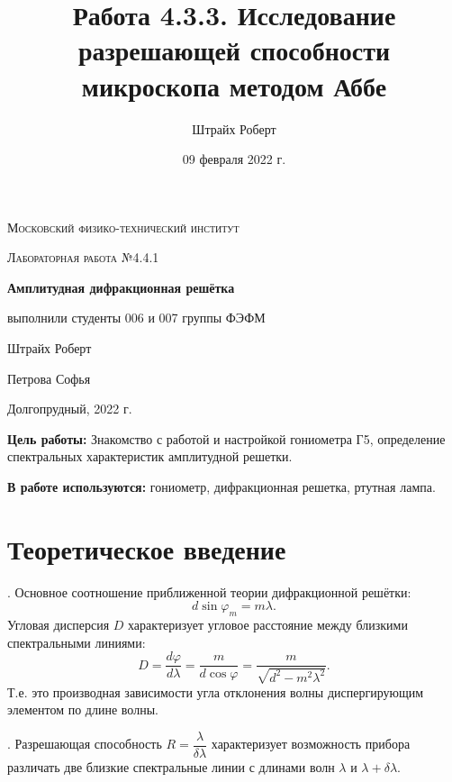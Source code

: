 \documentclass[a4paper, 12pt]{article}
\author{Штрайх Роберт}
\title{Работа 4.3.3. Исследование разрешающей способности микроскопа методом Аббе}
\date{09 февраля 2022 г.}
\begin{document}
\begin{titlepage}
	\centering
	\vspace{5cm}
	{\scshape\LARGE Московский физико-технический институт \par}
	\vspace{4cm}
	{\scshape\Large Лабораторная работа №4.4.1 \par}
	\vspace{1cm}
	{\huge\bfseries Амплитудная дифракционная решётка\par}
	\vspace{1cm}
	\vfill
\begin{flushright}
	{\Large выполнили студенты 006 и 007 группы ФЭФМ}\par
	\vspace{0.3cm}
	{\Large Штрайх Роберт}\par
	\vspace{0.3cm}
	{\Large Петрова Софья}
\end{flushright}
	

	\vfill

	Долгопрудный, 2022 г.
\end{titlepage}

\newpage

\textbf{Цель работы:} Знакомство с работой и настройкой гониометра Г5, определение спектральных характеристик амплитудной решетки.

\textbf{В работе используются:} гониометр, дифракционная решетка, ртутная лампа.

\section*{Теоретическое введение}

. Основное соотношение приближенной теории дифракционной решётки:
	\begin{equation}
	d\sin \varphi_m = m\lambda.
	\end{equation}
	Угловая дисперсия $D$ характеризует угловое расстояние между близкими спектральными линиями:
	\begin{equation}
	D = \frac{d\varphi}{d\lambda} = \frac{m}{d \cos \varphi}=\frac{m}{\sqrt{d^{2}-m^{2} \lambda^{2}}}.
	\end{equation}
Т.е. это производная зависимости угла отклонения волны диспергирующим элементом по длине волны.

. Разрешающая способность $R = \dfrac{\lambda}{\delta \lambda}$ характеризует возможность прибора различать две близкие спектральные линии с длинами волн $\lambda$ и $\lambda + \delta \lambda$.
\end{document}
